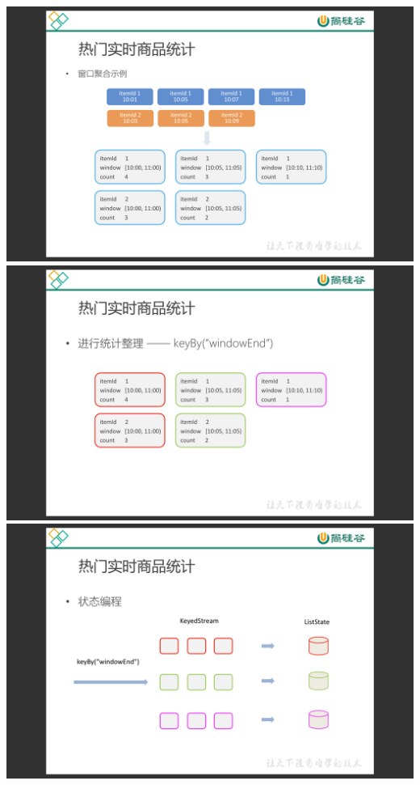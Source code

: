 \documentclass[oneside]{ctexbook}
\begin{document}
\noindent \includegraphics[width=\textwidth]{电商用户行为数据分析6.png}
\noindent \includegraphics[width=\textwidth]{电商用户行为数据分析7.png}
\noindent \includegraphics[width=\textwidth]{电商用户行为数据分析8.png}
\end{document}
